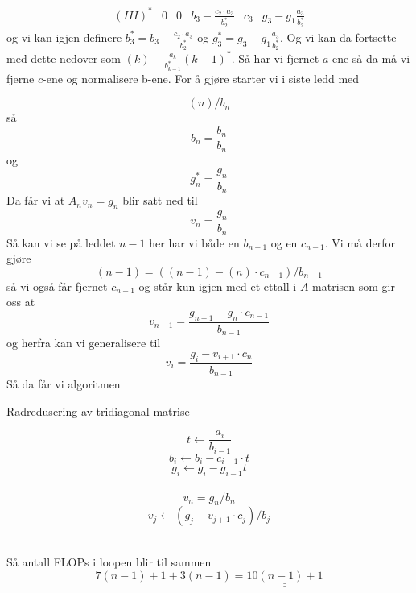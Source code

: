 \documentclass[english,notitlepage]{revtex4-1}  %
\begin{document}
$$ 
\begin{matrix}
(III)^* & 0 &0& b_3-\frac{c_2\cdot a_3}{b_2^*}&c_3 & g_3-g_1\frac{a_3}{b_2^*}
\end{matrix}
$$
og vi kan igjen definere $b_3^*=b_3-\frac{c_2\cdot a_3}{b_2^*}$ og $g_3^*=g_3-g_1\frac{a_3}{b_2^*}$. Og vi kan da fortsette med dette nedover som $(k)-\frac{a_{k}}{b_{k-1}^*}(k-1)^*$. Så har vi fjernet $a$-ene så da må vi fjerne $c$-ene og normalisere b-ene. For å gjøre starter vi i siste ledd med

$$
(n)/b_n
$$
så
$$
b_n=\frac{b_n}{b_n}
$$
og
$$
g_n^*=\frac{g_n}{b_n}
$$
Da får vi at
$
A_n v_n=g_n
$
blir satt ned til
$$
v_n=\frac{g_n}{b_n}
$$
Så kan vi se på leddet $n-1$ her har vi både en $b_{n-1}$ og en $c_{n-1}$. Vi må derfor gjøre $$(n-1)=((n-1)-(n)\cdot c_{n-1})/b_{n-1}$$ så vi også får fjernet $c_{n-1}$ og står kun igjen med et ettall i $A$ matrisen som gir oss at 
$$
v_{n-1}=\frac{g_{n-1}-g_n\cdot c_{n-1}}{b_{n-1}}
$$
og herfra kan vi generalisere til
$$
v_{i}=\frac{g_{i}-v_{i+1}\cdot c_{n}}{b_{n-1}}
$$
Så da får vi algoritmen
\begin{algorithm}[H]
	\caption{Radredusering av tridiagonal matrise}\label{algo:midpoint_rule}
	\begin{algorithmic}
		 
		\State $$t\leftarrow \frac{a_i}{b_{i-1}}$$ 
		$$
		b_{i}\leftarrow b_{i}-c_{i-1}\cdot t
		$$ 
		$$
		g_i\leftarrow g_i-g_{i-1} t
		$$  \\
		\EndFor
		\State $$
		v_n=g_n/b_n
		$$ 
		 
		\State
		$$
		v_j\leftarrow (g_j-v_{j+1}\cdot c_j)/b_j
		$$  \\
		\EndFor
	\end{algorithmic}
\end{algorithm}
Så antall FLOPs i loopen blir til sammen 
$$7(n-1)+1+3(n-1)=\underline{\underline{10(n-1)+1}}
$$
\end{document}
